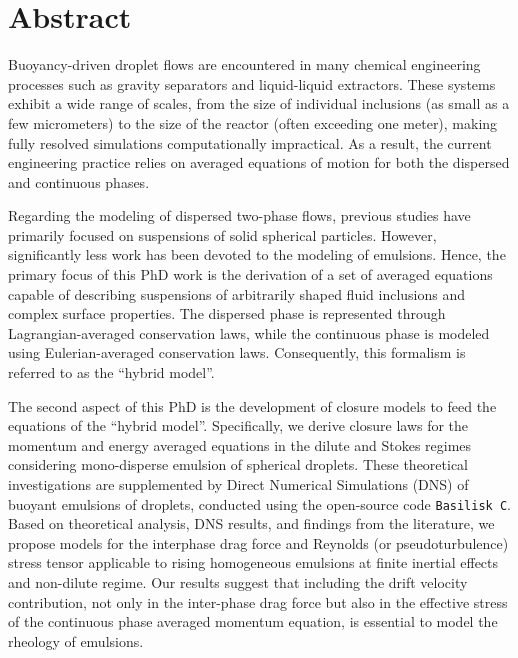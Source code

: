 \chapter*{\centering Abstract}

Buoyancy-driven droplet flows are encountered in many chemical engineering processes such as gravity separators and liquid-liquid extractors. 
These systems exhibit a wide range of scales, from the size of individual inclusions (as small as a few micrometers) to the size of the reactor (often exceeding one meter), making fully resolved simulations computationally impractical.
As a result, the current engineering practice relies on averaged equations of motion for both the dispersed and continuous phases.

Regarding the modeling of dispersed two-phase flows, previous studies have primarily focused on suspensions of solid spherical particles. 
However, significantly less work has been devoted to the modeling of emulsions. 
Hence, the primary focus of this PhD work is the derivation of a set of averaged equations capable of describing suspensions of arbitrarily shaped fluid inclusions and complex surface properties. 
The dispersed phase is represented through Lagrangian-averaged conservation laws, while the continuous phase is modeled using Eulerian-averaged conservation laws. 
Consequently, this formalism is referred to as the ``hybrid model''. 

The second aspect of this PhD is the development of closure models to feed the equations of the ``hybrid model''. 
Specifically, we derive closure laws for the momentum and energy averaged equations in the dilute and Stokes regimes considering mono-disperse emulsion of spherical droplets. 
These theoretical investigations are supplemented by Direct Numerical Simulations (DNS) of buoyant emulsions of droplets, conducted using the open-source code \texttt{Basilisk C}. 
Based on theoretical analysis, DNS results, and findings from the literature, we propose models for the interphase drag force and Reynolds (or pseudoturbulence) stress tensor applicable to rising homogeneous emulsions at finite inertial effects and non-dilute regime. 
Our results suggest that including the drift velocity contribution, not only in the inter-phase drag force but also in the effective stress of the continuous phase averaged momentum equation, is essential to model the rheology of emulsions. 

